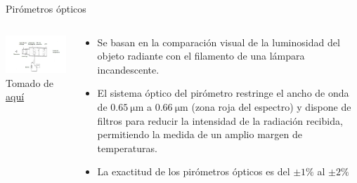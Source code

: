 \documentclass[aspectratio=169]{beamer}
\begin{document}
\begin{frame}{Pirómetros ópticos}
    \begin{columns}[c, onlytextwidth]
        \begin{column}{0.47\textwidth}
            \includegraphics[width=8.5cm]{fig/Pirometros-optico-esquema.jpg}
            \\ \tiny{Tomado de \href{https://como-funciona.co/un-pirometro/}{aquí}}
        \end{column}
        \begin{column}{0.50\textwidth}
            \begin{itemize}
                \item Se basan en la comparación visual de la luminosidad del objeto radiante con el filamento de una lámpara incandescente.
                \item El sistema óptico del pirómetro restringe el ancho de onda de $\SI{0.65}{\micro\meter}$ a $\SI{0.66}{\micro\meter}$ (zona roja del espectro) y dispone de filtros para reducir la intensidad de la radiación recibida, permitiendo la medida de un amplio margen de temperaturas. 
                \item La exactitud de los pirómetros ópticos es del $\pm 1\%$ al $\pm2\%$ 
            \end{itemize}
        \end{column}
        
    \end{columns}
\end{frame}
\end{document}
